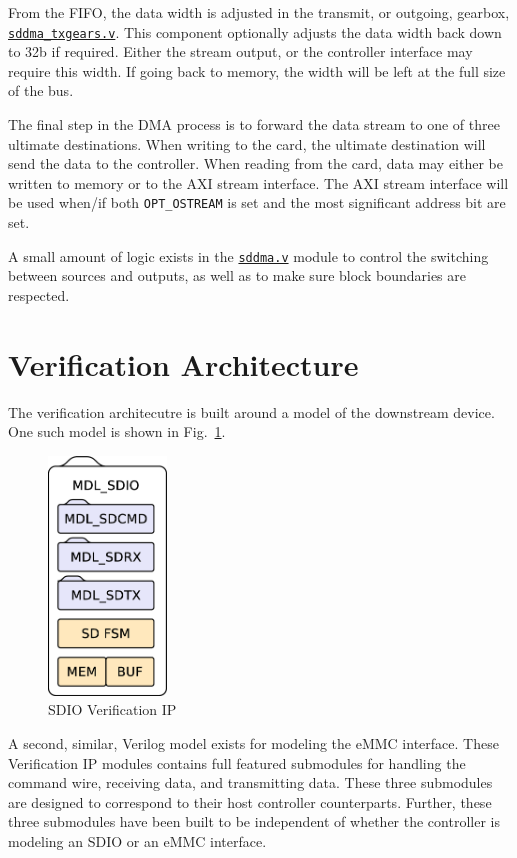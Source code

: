 \documentclass{gqtekspec}
\newcommand{\zhref}[2]{\href{#1}{\textcolor{dkblue}{#2}}}
\begin{document}
From the FIFO, the data width is adjusted in the transmit, or outgoing,
gearbox, \zhref{../rtl/sddma\_txgears.v}{\tt sddma\_txgears.v}.  This component
optionally adjusts the data width back down to 32b if required.  Either the
stream output, or the controller interface may require this width.  If going
back to memory, the width will be left at the full size of the bus.

The final step in the DMA process is to forward the data stream to one of
three ultimate destinations.  When writing to the card, the ultimate
destination will send the data to the controller.  When reading from the card,
data may either be written to memory or to the AXI stream interface.  The AXI
stream interface will be used when/if both {\tt OPT\_OSTREAM} is set and
the most significant address bit are set.

A small amount of logic exists in the \zhref{../rtl/sddma.v}{\tt sddma.v}
module to control the switching between sources and outputs, as well as to
make sure block boundaries are respected.
\section{Verification Architecture}\label{sec:arch-vip}
The verification architecutre is built around a model of the
downstream device.  One such model is shown in Fig.~\ref{fig:mdlsdio}.
\begin{figure}\begin{center}
\includegraphics[height=2.5in]{gfx/mdlsdio.eps}
\caption{SDIO Verification IP}\label{fig:mdlsdio}
\end{center}\end{figure}
A second, similar, Verilog model exists for modeling the eMMC interface.
These Verification IP modules contains full featured submodules for handling
the command wire, receiving data, and transmitting data.  These three
submodules are designed to correspond to their host controller counterparts.
Further, these three submodules have been built to be independent of whether
the controller is modeling an SDIO or an eMMC interface.
\end{document}
